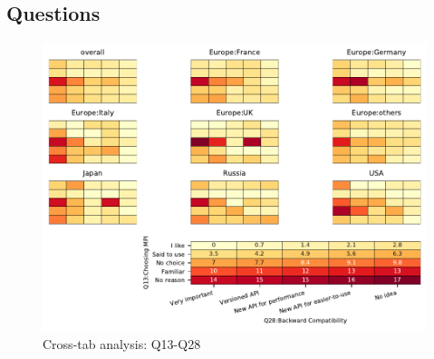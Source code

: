 
\subsection{Questions}


\begin{figure}
\begin{center}
\includegraphics[width=12cm]{../pdfs/Q13-Q28.pdf}
\caption{Cross-tab analysis: Q13-Q28}
\label{fig:Q13-Q28}
\end{center}
\end{figure}
